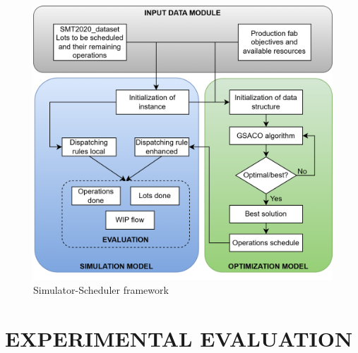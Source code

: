 \documentclass[runningheads]{llncs}
\begin{document}
\begin{figure}[t]
	\includegraphics[width=\textwidth]{sim_framework.png}
	\caption{Simulator-Scheduler framework}
	\label{fig:ss}
\end{figure}


\section{\uppercase{Experimental Evaluation}}
\label{sec:results}
\end{document}
